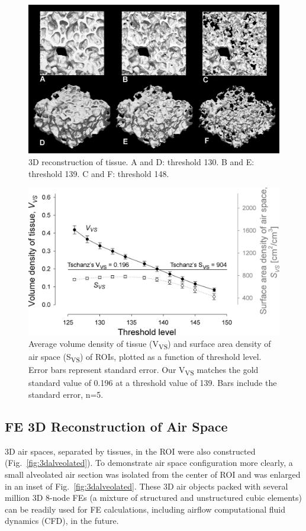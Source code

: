 \begin{figure}[htb]
	\centering
	\includegraphics[width=\imsize]{img/Tsuda2008/Tsuda-07}
	\caption{3D reconstruction of tissue. A and D: threshold 130. B and E: threshold 139. C and F: threshold 148.}
	\label{fig:3dreconstruction}
\end{figure}

\begin{figure}[htb]
	\centering
	\includegraphics[width=\imsize]{img/Tsuda2008/Tsuda-08}
	\caption{Average volume density of tissue (V\textsubscript{VS}) and surface area density of air
space (S\textsubscript{VS}) of ROIs, plotted as a function of threshold level. Error bars
represent standard error. Our V\textsubscript{VS} matches the gold standard value of 0.196 at
a threshold value of 139. Bars include the standard error, n=5.}
	\label{fig:VVSplot}
\end{figure}

\subsection{FE 3D Reconstruction of Air Space}
3D air spaces, separated by tissues, in the ROI were also constructed (Fig.~\ref{fig:3dalveolated}). To demonstrate air space configuration more clearly, a small alveolated air section was isolated from the center of ROI and was enlarged in an inset of Fig.~\ref{fig:3dalveolated}. These 3D air objects packed with several million 3D 8-node FEs (a mixture of structured and unstructured cubic elements) can be readily used for FE calculations, including airflow computational fluid dynamics (CFD), in the future.

